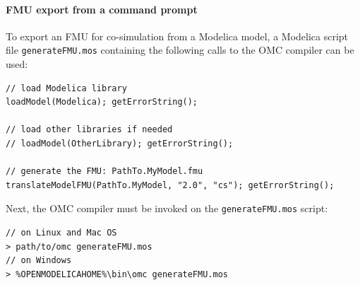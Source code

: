 \paragraph{FMU export from a command prompt}
%
To export an FMU for co-simulation from a Modelica model, a Modelica script file \texttt{generateFMU.mos} containing the following calls to the OMC compiler can be used:
%
%
%
\begin{lstlisting}[language=modelica]
// load Modelica library
loadModel(Modelica); getErrorString();

// load other libraries if needed
// loadModel(OtherLibrary); getErrorString();

// generate the FMU: PathTo.MyModel.fmu
translateModelFMU(PathTo.MyModel, "2.0", "cs"); getErrorString();
\end{lstlisting}
%
%
%
Next, the OMC compiler must be invoked on the \texttt{generateFMU\allowbreak{}.mos} script:
%
%
\begin{lstlisting}
// on Linux and Mac OS
> path/to/omc generateFMU.mos
// on Windows
> %OPENMODELICAHOME%\bin\omc generateFMU.mos
\end{lstlisting}
%
%
%
